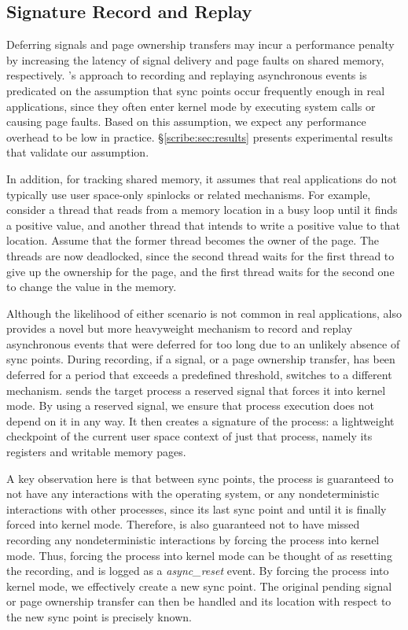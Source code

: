 \subsection{Signature Record and Replay}

Deferring signals and page ownership transfers may incur a performance
penalty by increasing the latency of signal delivery and page faults
on shared memory, respectively.  \scribe{}'s approach to recording and
replaying asynchronous events is predicated on the assumption that
sync points occur frequently enough in real applications, since they
often enter kernel mode by executing system calls or causing page
faults. Based on this assumption, we expect any performance overhead
to be low in practice.  \S\ref{scribe:sec:results} presents
experimental results that validate our assumption.

In addition, for tracking shared memory, it assumes that real
applications do not typically use user space-only spinlocks or related
mechanisms.  For example, consider a thread that reads from a memory
location in a busy loop until it finds a positive value, and another
thread that intends to write a positive value to that location.
Assume that the former thread becomes the owner of the page.  The
threads are now deadlocked, since the second thread waits for the
first thread to give up the ownership for the page, and the first
thread waits for the second one to change the value in the memory.

Although the likelihood of either scenario is not common in real
applications, \scribe{} also provides a novel but more heavyweight
mechanism to record and replay asynchronous events that were
deferred for too long due to an unlikely absence of sync points.
During recording, if a signal, or a page ownership transfer, has been
deferred for a period that exceeds a predefined threshold, \scribe{}
switches to a different mechanism.
\scribe{} sends the target process a reserved signal that forces it
into kernel mode.  By using a reserved signal, we ensure that process
execution does not depend on it in any way. It then creates a
signature of the process: a lightweight checkpoint of the current
user space context of just that process, namely its registers and
writable memory pages.

  

A key observation here is that between sync points, the process is
guaranteed to not have any interactions
with the operating system, or any nondeterministic interactions with
other processes, since its last sync point and until it is finally
forced into kernel mode.  Therefore, \scribe{} is also guaranteed not
to have missed recording any nondeterministic interactions by forcing
the process into kernel mode. Thus, forcing the process into kernel
mode can be thought of as resetting the recording, and is logged as a
{\it async\_reset} event.  By forcing the process into kernel mode, we
effectively create a new sync point.  The original pending signal or
page ownership transfer can then be handled and its location with
respect to the new sync point is precisely known.

